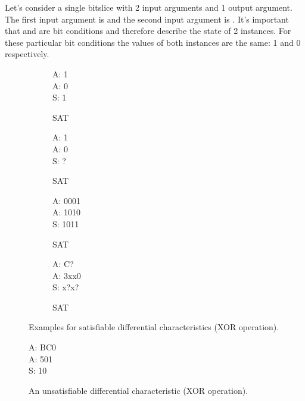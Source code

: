 Let's consider a single bitslice with 2 input arguments and 1 output argument. The first input argument is  and the second input argument is . It's important that  and  are bit conditions and therefore describe the state of 2 instances. For these particular bit conditions the values of both instances are the same: 1 and 0 respectively.
%
\begin{figure}[t]
  \begin{center}
    \begin{subfigure}[b]{0.23\textwidth}
      \begin{diffchar}
        A: 1 \\
        A: 0 \\
        S: 1
      \end{diffchar}
      \caption{SAT}
      \label{dc:xor1}
    \end{subfigure}%
    \begin{subfigure}[b]{0.23\textwidth}
      \begin{diffchar}
        A: 1 \\
        A: 0 \\
        S: ?
      \end{diffchar}
      \caption{SAT}
      \label{dc:xor2}
    \end{subfigure}%
    \begin{subfigure}[b]{0.23\textwidth}
      \begin{diffchar}
        A: 0001 \\
        A: 1010 \\
        S: 1011
      \end{diffchar}
      \caption{SAT}
      \label{dc:xor3}
    \end{subfigure}%
    \begin{subfigure}[b]{0.23\textwidth}
      \begin{diffchar}
        A: C\textendash{}\textendash{}? \\
        A: 3xx0 \\
        S: x?x?
      \end{diffchar}
      \caption{SAT}
      \label{dc:xor4}
    \end{subfigure}
    \caption{Examples for satisfiable differential characteristics (XOR operation).}
    \label{dc:xor-examples}
  \end{center}
\end{figure}
\begin{figure}[t]
  \begin{center}
    \begin{diffchar}
      A: BC0 \\
      A: 501 \\
      S: \textendash{}10
    \end{diffchar}
    \caption{An unsatisfiable differential characteristic (XOR operation).}
    \label{dc:xor-faulty}
  \end{center}
\end{figure}
